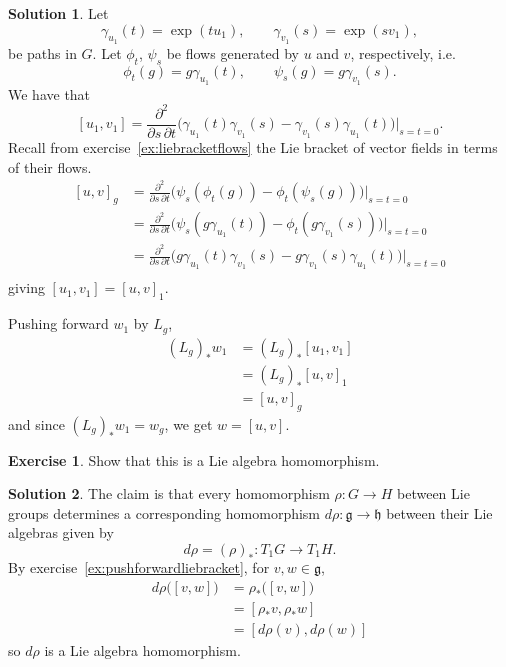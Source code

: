 \documentclass[11pt, a4paper]{report}
\theoremstyle{definition}
\newtheorem{exercise}{Exercise}[part]
\newtheorem{solution}{Solution}[part]
\newenvironment{ex}{\begin{exercise}}{\end{exercise}\pagebreak[1]}
\newenvironment{sol}{\begin{solution}}{\end{solution}\pagebreak[3]}
\begin{document}
\begin{sol}

Let
\[
    \gamma_{u_1}(t) = \exp(tu_1), \qquad
    \gamma_{v_1}(s) = \exp(sv_1),
\]
be paths in $G$. Let $\phi_t$, $\psi_s$ be flows generated by $u$ and $v$, respectively, i.e.
\[
    \phi_t(g) = g \gamma_{u_1}(t), \qquad
    \psi_s(g) = g \gamma_{v_1}(s).
\]
We have that
\[
    [u_1, v_1] = \frac{\partial^2}{\partial s\, \partial t}
        \bigl(
            \gamma_{u_1}(t) \gamma_{v_1}(s) - \gamma_{v_1}(s) \gamma_{u_1}(t)
        \bigr) \Big|_{s = t = 0}.
\]
Recall from exercise~\ref{ex:liebracketflows} the Lie bracket of vector fields in terms of their flows.
\begin{align*}
    {[u, v]}_g &= \frac{\partial^2}{\partial s\, \partial t}
            \bigl(
                \psi_s (\phi_t(g)) - \phi_t (\psi_s(g))
            \bigr) \Big|_{s = t = 0} \\
        &= \frac{\partial^2}{\partial s\, \partial t}
            \bigl(
                \psi_s (g \gamma_{u_1}(t)) - \phi_t (g\gamma_{v_1}(s))
            \bigr) \Big|_{s = t = 0} \\
        &= \frac{\partial^2}{\partial s\, \partial t}
            \bigl(
                g \gamma_{u_1}(t) \gamma_{v_1}(s) - g \gamma_{v_1}(s) \gamma_{u_1}(t)
            \bigr) \Big|_{s = t = 0} \\
\end{align*}
giving $[u_1, v_1] = {[u, v]}_1$.

Pushing forward $w_1$ by $L_g$,
\begin{align*}
    {(L_g)}_* w_1
        &= {(L_g)}_* [u_1, v_1] \\
        &= {(L_g)}_* {[u, v]}_1 \\
        &= {[u, v]}_g
\end{align*}
and since ${(L_g)}_* w_1 = w_g$, we get $w = [u, v]$.

\end{sol}

\begin{ex}

Show that this is a Lie algebra homomorphism.

\end{ex}

\begin{sol}

The claim is that every homomorphism $\rho: G \to H$ between Lie groups determines a corresponding homomorphism $d\rho: \mathfrak{g} \to \mathfrak{h}$ between their Lie algebras given by
\[
    d\rho = {(\rho)}_* : T_1 G \to T_1 H.
\]
By exercise~\ref{ex:pushforwardliebracket}, for $v, w \in \mathfrak{g}$,
\begin{align*}
    d\rho \bigl([v, w]\bigr) &= \rho_*\bigl([v, w]\bigr) \\
        &= [\rho_* v, \rho_* w] \\
        &= [d\rho (v), d\rho(w)]
\end{align*}
so $d\rho$ is a Lie algebra homomorphism.

\end{sol}
\end{document}
